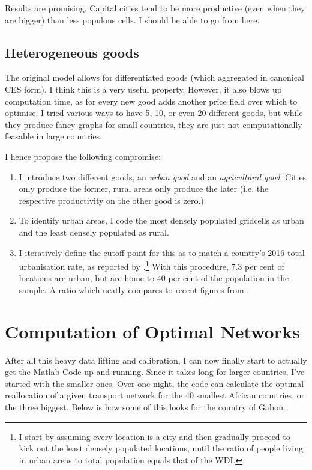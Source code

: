 \documentclass[11pt, oneside]{article}   	%
\begin{document}
Results are promising. Capital cities tend to be more productive (even when they are bigger) than less populous cells. I should be able to go from here.

\subsection{Heterogeneous goods}
The original model allows for differentiated goods (which aggregated in canonical CES form). I think this is a very useful property. However, it also blows up computation time, as for every new good adds another price field over which to optimise. I tried various ways to have 5, 10, or even 20 different goods, but while they produce fancy graphs for small countries, they are just not computationally feasable in large countries.

I hence propose the following compromise:
\begin{enumerate}
  \item I introduce two different goods, an \emph{urban good} and an \emph{agricultural good}. Cities only produce the former, rural areas only produce the later (i.e. the respective productivity on the other good is zero.)
  \item To identify urban areas, I code the most densely populated gridcells as urban and the least densely populated as rural.
  \item I iteratively define the cutoff point for this as to match a country's 2016 total urbanisation rate, as reported by \cite{the_world_bank_world_2017}.\footnote{I start by assuming every location is a city and then gradually proceed to kick out the least densely populated locations, until the ratio of people living in urban areas to total population equals that of the WDI.} With this procedure, 7.3 per cent of locations are urban, but are home to 40 per cent of the population in the sample. A ratio which neatly compares to recent figures from \cite{lall_africas_2017}.
\end{enumerate}

\section{Computation of Optimal Networks}
After all this heavy data lifting and calibration, I can now finally start to actually get the Matlab Code up and running. Since it takes long for larger countries, I've started with the smaller ones. Over one night, the code can calculate the optimal reallocation of a given transport network for the 40 smallest African countries, or the three biggest. Below is how some of this looks for the country of Gabon.
\end{document}
